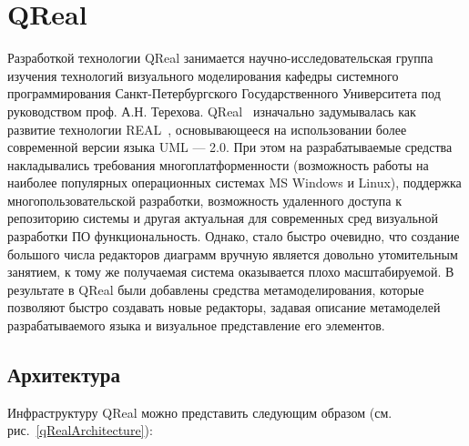 \documentclass[a4paper]{article}
\begin{document}
\section*{QReal}

Разработкой технологии QReal занимается научно-исследовательская группа изучения технологий визуального моделирования кафедры системного программирования Санкт-Петербургского Государственного Университета под руководством проф. А.Н. Терехова.  QReal~\cite{qreal}  изначально задумывалась как развитие технологии REAL~\cite{real}, основывающееся на использовании более современной версии языка UML --- 2.0. При этом на разрабатываемые средства накладывались требования многоплатформенности (возможность работы на наиболее популярных операционных системах MS Windows и Linux), поддержка многопользовательской разработки, возможность удаленного доступа к репозиторию системы и другая актуальная для современных сред визуальной разработки ПО функциональность. Однако, стало быстро очевидно, что создание большого числа редакторов диаграмм вручную является довольно утомительным занятием, к тому же получаемая система оказывается плохо масштабируемой. В результате в QReal были добавлены средства метамоделирования, которые позволяют быстро создавать новые редакторы, задавая описание метамоделей разрабатываемого языка и визуальное представление его элементов.


\subsection*{Архитектура}
Инфраструктуру QReal можно представить следующим образом (см. рис.~\ref{qRealArchitecture}):
\end{document}

